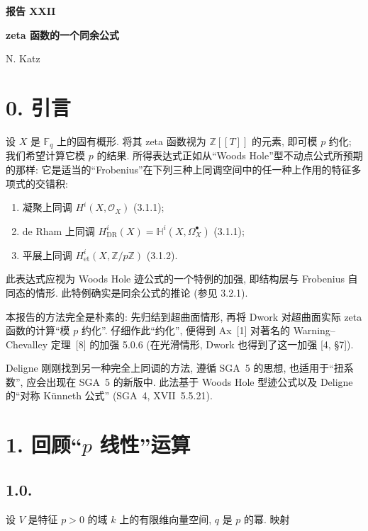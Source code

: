 \clearpage
\ExposeTOC
\begin{center}
{\Large\bfseries 报告 XXII}\par
\vspace{1.5cm}
{\Large\bfseries zeta 函数的一个同余公式}\par
\vspace{0.8cm}
{\large N. Katz}\par
\end{center}

\vspace{1.5cm}
\section*{0. 引言}

设 $X$ 是 $\mathbb F_q$ 上的固有概形. 将其 zeta 函数视为 $\mathbb Z[[T]]$ 的元素,
即可模 $p$ 约化; 我们希望计算它模 $p$ 的结果.
所得表达式正如从“Woods Hole”型不动点公式所预期的那样:
它是适当的“Frobenius”在下列三种上同调空间中的任一种上作用的特征多项式的交错积:

\begin{enumerate}[label=\arabic*)]
\item 凝聚上同调 $H^i(X,\mathcal O_X)$ (3.1.1);
\item de Rham 上同调
  $H^i_{\mathrm{DR}}(X)=\mathbb H^i(X,\Omega_X^\bullet)$ (3.1.1);
\item 平展上同调 $H^i_{\mathrm{et}}(X,\mathbb Z/p\mathbb Z)$ (3.1.2).
\end{enumerate}

此表达式应视为 Woods Hole 迹公式的一个特例的加强,
即结构层与 Frobenius 自同态的情形. 此特例确实是同余公式的推论 (参见 3.2.1).

本报告的方法完全是朴素的: 先归结到超曲面情形,
再将 Dwork 对超曲面实际 zeta 函数的计算“模 $p$ 约化”.
仔细作此“约化”, 便得到 Ax~[1] 对著名的 Warning--Chevalley 定理~[8] 的加强 5.0.6
(在光滑情形, Dwork 也得到了这一加强 [4, \S 7]).

Deligne 刚刚找到另一种完全上同调的方法, 遵循 SGA~5 的思想,
也适用于“扭系数”, 应会出现在 SGA~5 的新版中.
此法基于 Woods Hole 型迹公式以及 Deligne 的“对称 Künneth 公式”
(SGA~4, XVII~5.5.21).

\section*{1. 回顾“$p$ 线性”运算}

\subsection*{1.0.}
设 $V$ 是特征 $p>0$ 的域 $k$ 上的有限维向量空间, $q$ 是 $p$ 的幂. 映射

